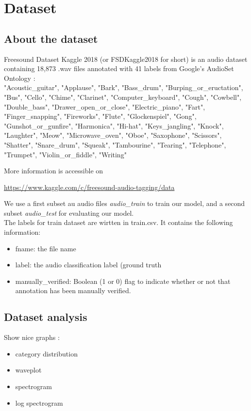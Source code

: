 \documentclass{article} %
\begin{document}
\section{Dataset}
	\subsection{About the dataset}
		Freesound Dataset Kaggle 2018 (or FSDKaggle2018 for short) is an audio dataset containing 18,873 .wav files annotated with 41 labels from Google's AudioSet Ontology \cite{cite1}:\\

			"Acoustic\_guitar", "Applause", "Bark", "Bass\_drum", "Burping\_or\_eructation", "Bus", "Cello", "Chime", "Clarinet", "Computer\_keyboard", "Cough", "Cowbell", "Double\_bass", "Drawer\_open\_or\_close", "Electric\_piano", "Fart", "Finger\_snapping", "Fireworks", "Flute", "Glockenspiel", "Gong", "Gunshot\_or\_gunfire", "Harmonica", "Hi-hat", "Keys\_jangling", "Knock", "Laughter", "Meow", "Microwave\_oven", "Oboe", "Saxophone", "Scissors", "Shatter", "Snare\_drum", "Squeak", "Tambourine", "Tearing", "Telephone", "Trumpet", "Violin\_or\_fiddle", "Writing"\\
			\newline

		More information is accessible on 
		\begin{center} 
		\url{https://www.kaggle.com/c/freesound-audio-tagging/data}
		\end{center}

		We use a first subset au audio files \emph{audio_train} to train our model, and a second subset \emph{audio_test} for evaluating our model.\\
		The labels for train dataset are wirtten in train.csv. It contains the following information:
			\begin{itemize}
			    \item fname: the file name
			    \item label: the audio classification label (ground truth
			    \item manually\_verified: Boolean (1 or 0) flag to indicate whether or not that annotation has been manually verified.
			\end{itemize}

	\subsection{Dataset analysis}
		Show nice graphs :
		\begin{itemize}
			    \item category distribution
			    \item waveplot
			    \item spectrogram
			    \item log spectrogram
			\end{itemize}
\end{document}
